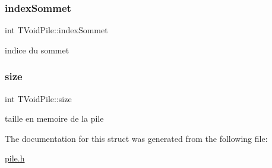 \subsubsection{\texorpdfstring{index\+Sommet}{indexSommet}}
{\footnotesize\ttfamily int T\+Void\+Pile\+::index\+Sommet}

indice du sommet \mbox{\label{structTVoidPile_a1c5535f494a3c080f0ee15e615105895}} 
\subsubsection{\texorpdfstring{size}{size}}
{\footnotesize\ttfamily int T\+Void\+Pile\+::size}

taille en memoire de la pile 

The documentation for this struct was generated from the following file\+:\begin{DoxyCompactItemize}
\item 
\hyperlink{pile_8h}{pile.\+h}\end{DoxyCompactItemize}
